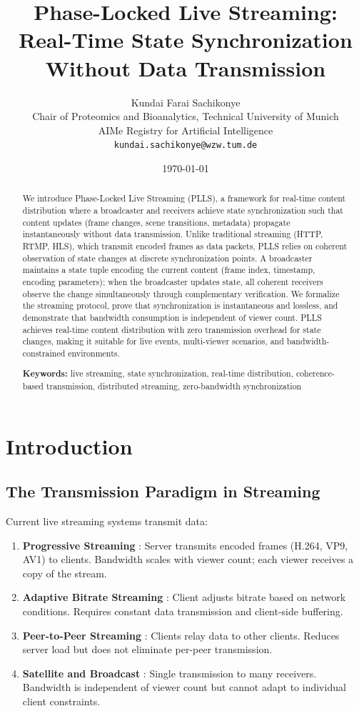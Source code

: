 \documentclass[twocolumn,10pt,a4paper]{article}
\title{\textbf{Phase-Locked Live Streaming: \\ Real-Time State Synchronization Without Data Transmission}}
\author{Kundai Farai Sachikonye\\
\small Chair of Proteomics and Bioanalytics, Technical University of Munich\\
\small AIMe Registry for Artificial Intelligence\\
\small \texttt{kundai.sachikonye@wzw.tum.de}}
\date{\today}
\theoremstyle{plain}
\theoremstyle{definition}
\providecommand{\keywords}[1]{\par\medskip\noindent\textbf{Keywords:} #1}
\begin{document}
\maketitle

\begin{abstract}
We introduce Phase-Locked Live Streaming (PLLS), a framework for real-time content distribution where a broadcaster and receivers achieve state synchronization such that content updates (frame changes, scene transitions, metadata) propagate instantaneously without data transmission. Unlike traditional streaming (HTTP, RTMP, HLS), which transmit encoded frames as data packets, PLLS relies on coherent observation of state changes at discrete synchronization points. A broadcaster maintains a state tuple encoding the current content (frame index, timestamp, encoding parameters); when the broadcaster updates state, all coherent receivers observe the change simultaneously through complementary verification. We formalize the streaming protocol, prove that synchronization is instantaneous and lossless, and demonstrate that bandwidth consumption is independent of viewer count. PLLS achieves real-time content distribution with zero transmission overhead for state changes, making it suitable for live events, multi-viewer scenarios, and bandwidth-constrained environments.

\keywords{live streaming, state synchronization, real-time distribution, coherence-based transmission, distributed streaming, zero-bandwidth synchronization}
\end{abstract}

\section{Introduction}

\subsection{The Transmission Paradigm in Streaming}

Current live streaming systems transmit data:
\begin{enumerate}
\item \textbf{Progressive Streaming} \cite{kurose2012computer}: Server transmits encoded frames (H.264, VP9, AV1) to clients. Bandwidth scales with viewer count; each viewer receives a copy of the stream.
\item \textbf{Adaptive Bitrate Streaming} \cite{stockhausen2016http}: Client adjusts bitrate based on network conditions. Requires constant data transmission and client-side buffering.
\item \textbf{Peer-to-Peer Streaming} \cite{khan2012peer}: Clients relay data to other clients. Reduces server load but does not eliminate per-peer transmission.
\item \textbf{Satellite and Broadcast} \cite{strang1998terrestrial}: Single transmission to many receivers. Bandwidth is independent of viewer count but cannot adapt to individual client constraints.
\end{enumerate}
\end{document}
